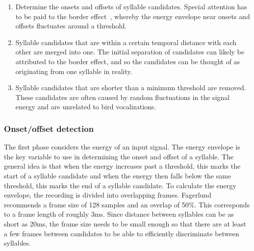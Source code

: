 \begin{enumerate}

  \item Determine the onsets and offsets of syllable candidates. Special
    attention has to be paid to the border effect~\cite{li2001classification},
    whereby the energy envelope near onsets and offsets fluctuates around a
    threshold.

  \item Syllable candidates that are within a certain temporal distance with
    each other are merged into one. The initial separation of candidates can
    likely be attributed to the border effect, and so the candidates can be
    thought of as originating from one syllable in reality.

  \item Syllable candidates that are shorter than a minimum threshold are
    removed. These candidates are often caused by random fluctuations in the
    signal energy and are unrelated to bird vocalizations.

\end{enumerate}

\subsubsection{Onset/offset detection}

The first phase considers the energy of an input signal. The energy envelope is
the key variable to use in determining the onset and offset of a syllable. The
general idea is that when the energy increases past a threshold, this marks the
start of a syllable candidate and when the energy then falls below the same
threshold, this marks the end of a syllable candidate. To calculate the energy
envelope, the recording is divided into overlapping frames.
Fagerlund~\cite{fagerlund2004automatic} recommends a frame size of 128 samples
and an overlap of 50\%. This corresponds to a frame length of roughly 3ms. Since
distance between syllables can be as short as 20ms, the frame size needs to be
small enough so that there are at least a few frames between candidates to be
able to efficiently discriminate between syllables.

